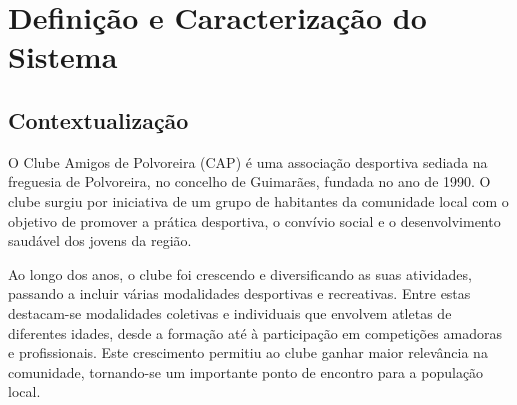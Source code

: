 \documentclass[a4paper,12pt]{scrreprt}
\begin{document}
\pagebreak



\renewcommand{\contentsname}{Índice}

\tableofcontents

\pagebreak

\listoffigures





\chapter{Definição e Caracterização do Sistema}

\section{Contextualização}
O Clube Amigos de Polvoreira (CAP) é uma associação desportiva sediada na freguesia de Polvoreira, no concelho de Guimarães, fundada no ano de 1990. O clube surgiu por iniciativa de um grupo de habitantes da comunidade local com o objetivo de promover a prática desportiva, o convívio social e o desenvolvimento saudável dos jovens da região.

Ao longo dos anos, o clube foi crescendo e diversificando as suas atividades, passando a incluir várias modalidades desportivas e recreativas. Entre estas destacam-se modalidades coletivas e individuais que envolvem atletas de diferentes idades, desde a formação até à participação em competições amadoras e profissionais. Este crescimento permitiu ao clube ganhar maior relevância na comunidade, tornando-se um importante ponto de encontro para a população local.
\end{document}
